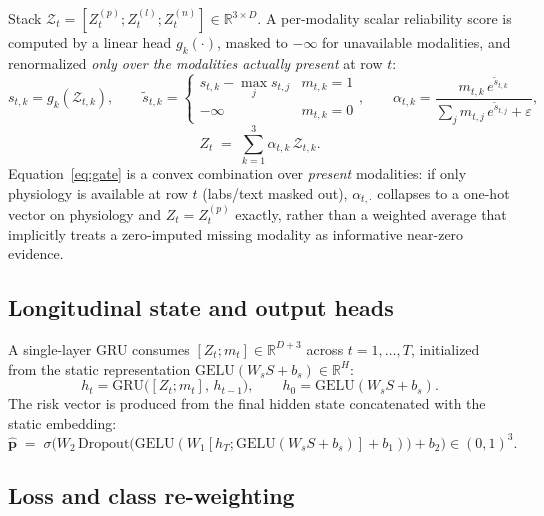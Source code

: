\documentclass[11pt]{article}
\newcommand{\R}{\mathbb{R}}
\newcommand{\1}[1]{\mathbf{1}\!\left[#1\right]}
\begin{document}
Stack $\mathcal{Z}_t = [Z^{(p)}_t; Z^{(l)}_t; Z^{(n)}_t] \in \R^{3\times D}$. A per-modality scalar reliability score is computed by a linear head $g_k(\cdot)$, masked to $-\infty$ for unavailable modalities, and renormalized \emph{only over the modalities actually present} at row $t$:
\begin{equation}
s_{t,k} = g_k(\mathcal{Z}_{t,k}), \qquad
\tilde s_{t,k} = \begin{cases} s_{t,k} - \max_j s_{t,j} & m_{t,k}=1 \\ -\infty & m_{t,k}=0\end{cases}, \qquad
\alpha_{t,k} = \frac{m_{t,k}\, e^{\tilde s_{t,k}}}{\sum_{j} m_{t,j}\, e^{\tilde s_{t,j}} + \varepsilon},
\end{equation}
\begin{equation}
Z_t \;=\; \sum_{k=1}^{3} \alpha_{t,k}\, \mathcal{Z}_{t,k}. \label{eq:gate}
\end{equation}
Equation~\eqref{eq:gate} is a convex combination over \emph{present} modalities: if only physiology is available at row $t$ (labs/text masked out), $\alpha_{t,\cdot}$ collapses to a one-hot vector on physiology and $Z_t = Z_t^{(p)}$ exactly, rather than a weighted average that implicitly treats a zero-imputed missing modality as informative near-zero evidence.

\subsection{Longitudinal state and output heads}

A single-layer GRU consumes $[Z_t; m_t] \in \R^{D+3}$ across $t=1,\dots,T$, initialized from the static representation $\mathrm{GELU}(W_s S + b_s) \in \R^H$:
\begin{equation}
h_t = \mathrm{GRU}\big([Z_t;m_t],\, h_{t-1}\big), \qquad h_0 = \mathrm{GELU}(W_sS+b_s).
\end{equation}
The risk vector is produced from the final hidden state concatenated with the static embedding:
\begin{equation}
\hat{\bm p} \;=\; \sigma\Big(W_2\,\mathrm{Dropout}\big(\mathrm{GELU}(W_1[h_T; \mathrm{GELU}(W_sS+b_s)]+b_1)\big)+b_2\Big) \in (0,1)^{3}. \label{eq:head}
\end{equation}

\subsection{Loss and class re-weighting}
\end{document}
